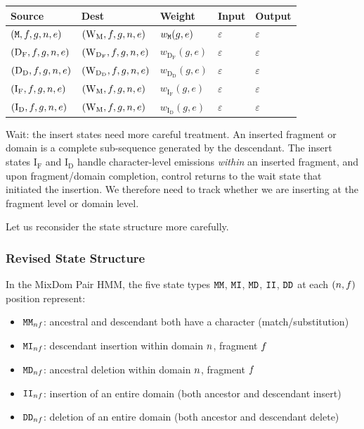 \begin{center}
\renewcommand{\arraystretch}{1.5}
\begin{tabular}{lllll}
\hline
Source & Dest & Weight & Input & Output \\
\hline
$({\tt M}, f, g, n, e)$ & $(\mathrm{W_M}, f, g, n, e)$ &
  $w_{{\tt M}}(g, e)$ & $\varepsilon$ & $\varepsilon$ \\
$(\mathrm{D_F}, f, g, n, e)$ & $(\mathrm{W_{D_F}}, f, g, n, e)$ &
  $w_{\mathrm{D_F}}(g, e)$ & $\varepsilon$ & $\varepsilon$ \\
$(\mathrm{D_D}, f, g, n, e)$ & $(\mathrm{W_{D_D}}, f, g, n, e)$ &
  $w_{\mathrm{D_D}}(g, e)$ & $\varepsilon$ & $\varepsilon$ \\
\hline
$(\mathrm{I_F}, f, g, n, e)$ & $(\mathrm{W_M}, f, g, n, e)$ &
  $w_{\mathrm{I_F}}(g, e)$ & $\varepsilon$ & $\varepsilon$ \\
$(\mathrm{I_D}, f, g, n, e)$ & $(\mathrm{W_M}, f, g, n, e)$ &
  $w_{\mathrm{I_D}}(g, e)$ & $\varepsilon$ & $\varepsilon$ \\
\hline
\end{tabular}
\end{center}

Wait: the insert states need more careful treatment.
An inserted fragment or domain is a complete sub-sequence generated by the descendant.
The insert states $\mathrm{I_F}$ and $\mathrm{I_D}$ handle character-level emissions
\emph{within} an inserted fragment, and upon fragment/domain completion, control returns
to the wait state that initiated the insertion.
We therefore need to track whether we are inserting at the fragment level or domain level.

Let us reconsider the state structure more carefully.

\subsubsection{Revised State Structure}
\label{sec:revised-states}

In the MixDom Pair HMM, the five state types ${\tt M}{\tt M}$, ${\tt M}{\tt I}$, ${\tt M}{\tt D}$, ${\tt I}{\tt I}$, ${\tt D}{\tt D}$
at each $(n, f)$ position represent:
\begin{itemize}
\item ${\tt M}{\tt M}_{nf}$: ancestral and descendant both have a character (match/substitution)
\item ${\tt M}{\tt I}_{nf}$: descendant insertion within domain $n$, fragment $f$
\item ${\tt M}{\tt D}_{nf}$: ancestral deletion within domain $n$, fragment $f$
\item ${\tt I}{\tt I}_{nf}$: insertion of an entire domain (both ancestor and descendant insert)
\item ${\tt D}{\tt D}_{nf}$: deletion of an entire domain (both ancestor and descendant delete)
\end{itemize}

